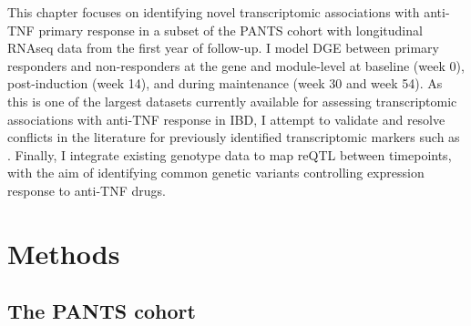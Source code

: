This chapter focuses on identifying novel transcriptomic associations with anti-\gls{TNF} primary response 
in a subset of the \gls{PANTS} cohort with longitudinal \gls{RNAseq} data from the first year of follow-up.
I model \gls{DGE} between primary responders and non-responders at the gene and module-level 
at baseline (week 0), post-induction (week 14), and during maintenance (week 30 and week 54).
As this is one of the largest datasets currently available for assessing transcriptomic associations with anti-\gls{TNF} response in \gls{IBD},
I attempt to validate and resolve conflicts in the literature for previously identified transcriptomic markers such as .
Finally, I integrate existing genotype data to map \gls{reQTL} between timepoints,
with the aim of identifying common genetic variants controlling expression response to anti-\gls{TNF} drugs.


\section{Methods}

\subsection{The PANTS cohort}

